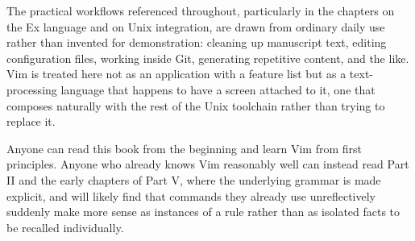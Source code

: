 The practical workflows referenced throughout, particularly in the chapters on the Ex language and on Unix integration, are drawn from ordinary daily use rather than invented for demonstration: cleaning up manuscript text, editing configuration files, working inside Git, generating repetitive content, and the like. Vim is treated here not as an application with a feature list but as a text-processing language that happens to have a screen attached to it, one that composes naturally with the rest of the Unix toolchain rather than trying to replace it.

Anyone can read this book from the beginning and learn Vim from first principles. Anyone who already knows Vim reasonably well can instead read Part II and the early chapters of Part V, where the underlying grammar is made explicit, and will likely find that commands they already use unreflectively suddenly make more sense as instances of a rule rather than as isolated facts to be recalled individually.
